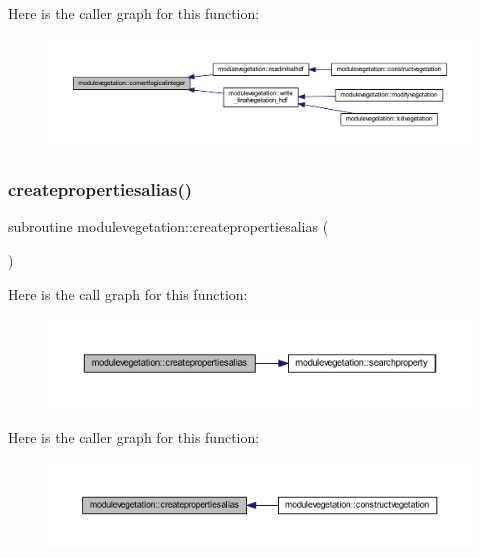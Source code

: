 Here is the caller graph for this function\+:\nopagebreak
\begin{figure}[H]
\begin{center}
\leavevmode
\includegraphics[width=350pt]{namespacemodulevegetation_af795c019d50bbacd6767423599de5ea5_icgraph}
\end{center}
\end{figure}
\mbox{\label{namespacemodulevegetation_a6aff1147d516330fb474cb37975e7075}} 
\subsubsection{\texorpdfstring{createpropertiesalias()}{createpropertiesalias()}}
{\footnotesize\ttfamily subroutine modulevegetation\+::createpropertiesalias (\begin{DoxyParamCaption}{ }\end{DoxyParamCaption})\hspace{0.3cm}{\ttfamily [private]}}

Here is the call graph for this function\+:\nopagebreak
\begin{figure}[H]
\begin{center}
\leavevmode
\includegraphics[width=350pt]{namespacemodulevegetation_a6aff1147d516330fb474cb37975e7075_cgraph}
\end{center}
\end{figure}
Here is the caller graph for this function\+:\nopagebreak
\begin{figure}[H]
\begin{center}
\leavevmode
\includegraphics[width=350pt]{namespacemodulevegetation_a6aff1147d516330fb474cb37975e7075_icgraph}
\end{center}
\end{figure}
\mbox{\label{namespacemodulevegetation_ae10e09bee209b569a0f021506b4bbf27}} 
